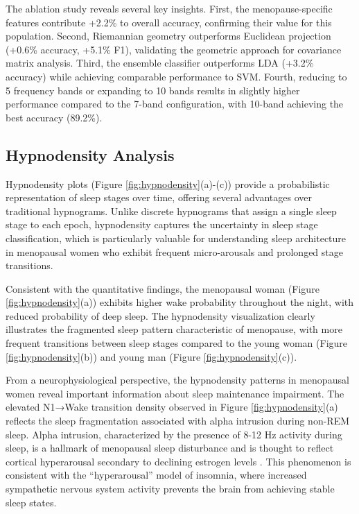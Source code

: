 \documentclass[ASNA,twocolumn]{USG}
\begin{document}
The ablation study reveals several key insights. First, the menopause-specific features contribute +2.2\% to overall accuracy, confirming their value for this population. Second, Riemannian geometry outperforms Euclidean projection (+0.6\% accuracy, +5.1\% F1), validating the geometric approach for covariance matrix analysis. Third, the ensemble classifier outperforms LDA (+3.2\% accuracy) while achieving comparable performance to SVM. Fourth, reducing to 5 frequency bands or expanding to 10 bands results in slightly higher performance compared to the 7-band configuration, with 10-band achieving the best accuracy (89.2\%).

\subsection{Hypnodensity Analysis}

Hypnodensity plots (Figure \ref{fig:hypnodensity}(a)-(c)) provide a probabilistic representation of sleep stages over time, offering several advantages over traditional hypnograms. Unlike discrete hypnograms that assign a single sleep stage to each epoch, hypnodensity captures the uncertainty in sleep stage classification, which is particularly valuable for understanding sleep architecture in menopausal women who exhibit frequent micro-arousals and prolonged stage transitions.

Consistent with the quantitative findings, the menopausal woman (Figure \ref{fig:hypnodensity}(a)) exhibits higher wake probability throughout the night, with reduced probability of deep sleep. The hypnodensity visualization clearly illustrates the fragmented sleep pattern characteristic of menopause, with more frequent transitions between sleep stages compared to the young woman (Figure \ref{fig:hypnodensity}(b)) and young man (Figure \ref{fig:hypnodensity}(c)).

From a neurophysiological perspective, the hypnodensity patterns in menopausal women reveal important information about sleep maintenance impairment. The elevated N1→Wake transition density observed in Figure \ref{fig:hypnodensity}(a) reflects the sleep fragmentation associated with alpha intrusion during non-REM sleep. Alpha intrusion, characterized by the presence of 8-12 Hz activity during sleep, is a hallmark of menopausal sleep disturbance and is thought to reflect cortical hyperarousal secondary to declining estrogen levels \cite{Baker2023}. This phenomenon is consistent with the ``hyperarousal'' model of insomnia, where increased sympathetic nervous system activity prevents the brain from achieving stable sleep states.
\end{document}
